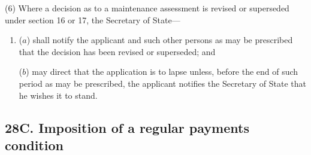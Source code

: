 \documentclass[12pt,a4paper]{article}
\begin{document}
%
%
%

(6) Where a decision as to a maintenance assessment is revised or superseded under section 16 or 17, the Secretary of State—
\begin{enumerate}\item[]
($a$) shall notify the applicant and such other persons as may be prescribed that the decision has been revised or superseded; and

($b$) may direct that the application is to lapse unless, before the end of such period as may be prescribed, the applicant notifies the Secretary of State that he wishes it to stand.
\end{enumerate}


\subsection{28C. Imposition of a regular payments condition}
\end{document}
